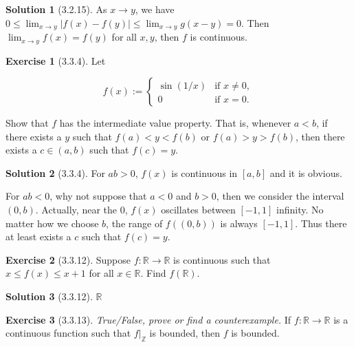 \documentclass{article}
\theoremstyle{definition}
\newtheorem{exe}{Exercise}[section]
\newtheorem{sol}{Solution}[exe]
\begin{document}
\begin{sol}[3.2.15]

As $x\to y$, we have $0\leq \lim_{x\to y}|f(x)-f(y)| \leq\lim_{x\to y}g(x-y)=0$. Then $\lim_{x\to y} f(x)=f(y)$ for all $x,y$, then $f$ is continuous.
    
\end{sol}

\begin{exe}[3.3.4]
    Let

$$f(x) := \begin{cases} 
\sin(1/x) & \text{if } x \neq 0, \\
0 & \text{if } x = 0.
\end{cases}$$


Show that \( f \) has the intermediate value property. That is, whenever \( a < b \), if there exists a \( y \) such that \( f(a) < y < f(b) \) or \( f(a) > y > f(b) \), then there exists a \( c \in (a, b) \) such that \( f(c) = y \).
\end{exe}




\begin{sol}[3.3.4]
For $ab>0$, $f(x)$ is continuous in $[a,b]$ and it is obvious.

For $ab<0$, why not suppose that $a<0$ and $b>0$, then we consider the interval $(0,b)$. Actually, near the $0$, $f(x)$ oscillates between 
$[-1,1]$ infinity. No matter how we choose $b$, the range of $f((0,b))$ is always $[-1,1]$. Thus there at least exists a $c$ such that $f(c)=y$.


\end{sol}







\begin{exe}[3.3.12]
    Suppose \( f: \mathbb{R} \rightarrow \mathbb{R} \) is continuous such that \( x \leq f(x) \leq x + 1 \) for all \( x \in \mathbb{R} \). Find \( f(\mathbb{R}) \).
\end{exe}

\begin{sol}[3.3.12]
    $\mathbb{R}$
\end{sol}

\begin{exe}[3.3.13]
    \textit{True/False, prove or find a counterexample.} If \( f: \mathbb{R} \rightarrow \mathbb{R} \) is a continuous function such that \( f|_{\mathbb{Z}} \) is bounded, then \( f \) is bounded.
\end{exe}
\end{document}
